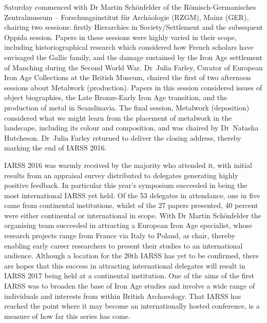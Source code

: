 \documentclass[ngerman,english]{ijsra}
\begin{document}
Saturday commenced with Dr Martin Schönfelder of the \foreignlanguage{ngerman}{Römisch\--German\-isches Zentralmuseum --
 Forschungsinstitut für Archäologie} (RZGM), Mainz (GER), chairing two sessions: firstly Hierarchies in
  Society/Settlement and the subsequent Oppida session. Papers in these sessions were highly varied in
   their scope, including historiographical research which considered how French scholars have envisaged
    the Gallic family, and the damage sustained by the Iron Age settlement of Manching during the Second World War. 
Dr~Julia Farley, Curator of European Iron Age Collections at the British Museum, chaired the first of two afternoon sessions about Metalwork (production).  Papers in this session considered issues of object biographies, the Late Bronze-Early Iron Age transition, and the production of metal in Scandinavia. The final session, Metalwork (deposition) considered what we might learn from the placement of metalwork in the landscape, including its colour and composition, and was chaired by Dr~Natasha Hutcheson. 
Dr~Julia Farley returned to deliver the closing address, thereby marking the end of IARSS 2016.


IARSS 2016 was warmly received by the majority who attended it, with initial results from an appraisal survey distributed to delegates generating highly positive feedback. In particular this year’s symposium succeeded in being the most international IARSS yet held. 
Of the 53 delegates in attendance, one in five came from continental institutions, whilst of the 27 papers presented, 40 percent were either continental or international in scope. With Dr Martin Schönfelder the organising team succeeded in attracting a European Iron Age specialist, whose research projects range from France via Italy to Poland, as chair, thereby enabling early career researchers to present their studies to an international audience. Although a location for the 20th IARSS has yet to be confirmed, there are hopes that this success in attracting international delegates will result in IARSS 2017 being held at a continental institution. One of the aims of the first IARSS was to broaden the base of Iron Age studies and involve a wide range of individuals and interests from within British Archaeology. 
That IARSS has reached the point where it may become an internationally hosted conference, is a measure of how far this series has come.
\end{document}
